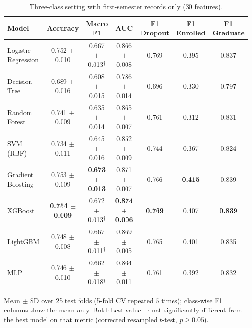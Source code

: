 \begin{table}[H]
\centering
\small
\setlength{\tabcolsep}{3.5pt}
\caption{Three-class setting with first-semester records only (30 features).}
\label{tab:sem1}
\begin{tabular}{lcccccc}
\toprule
Model & Accuracy & Macro F1 & AUC & F1 Dropout & F1 Enrolled & F1 Graduate \\
\midrule
Logistic Regression & 0.752 $\pm$ 0.010 & 0.667 $\pm$ 0.013$^{\dagger}$ & 0.866 $\pm$ 0.008 & 0.769 & 0.395 & 0.837 \\
Decision Tree & 0.689 $\pm$ 0.016 & 0.608 $\pm$ 0.015 & 0.786 $\pm$ 0.014 & 0.696 & 0.330 & 0.797 \\
Random Forest & 0.741 $\pm$ 0.009 & 0.635 $\pm$ 0.014 & 0.865 $\pm$ 0.007 & 0.761 & 0.312 & 0.831 \\
SVM (RBF) & 0.734 $\pm$ 0.011 & 0.645 $\pm$ 0.016 & 0.852 $\pm$ 0.009 & 0.744 & 0.367 & 0.824 \\
Gradient Boosting & 0.753 $\pm$ 0.009 & \textbf{0.673 $\pm$ 0.013} & 0.871 $\pm$ 0.007 & 0.766 & \textbf{0.415} & 0.839 \\
XGBoost & \textbf{0.754 $\pm$ 0.009} & 0.672 $\pm$ 0.013$^{\dagger}$ & \textbf{0.874 $\pm$ 0.006} & \textbf{0.769} & 0.407 & \textbf{0.839} \\
LightGBM & 0.748 $\pm$ 0.008 & 0.667 $\pm$ 0.011$^{\dagger}$ & 0.869 $\pm$ 0.005 & 0.765 & 0.401 & 0.835 \\
MLP & 0.746 $\pm$ 0.010 & 0.662 $\pm$ 0.018$^{\dagger}$ & 0.864 $\pm$ 0.011 & 0.761 & 0.392 & 0.832 \\
\bottomrule
\end{tabular}
\par\smallskip\footnotesize Mean $\pm$ SD over 25 test folds (5-fold CV repeated 5 times); class-wise F1 columns show the mean only. Bold: best value. $^{\dagger}$: not significantly different from the best model on that metric (corrected resampled $t$-test, $p\ge 0.05$).
\end{table}
